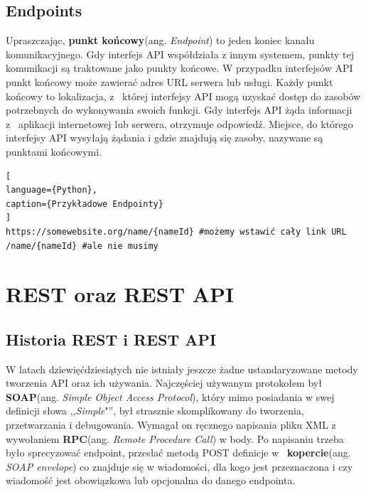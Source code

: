 \documentclass[oneside,polski,logo,indent]{amuthesis}
\begin{document}
\begin{center}
\subsection{Endpoints}
\end{center}
Upraszczając, \textbf{punkt końcowy}(ang. \emph{Endpoint}) to jeden koniec kanału komunikacyjnego. Gdy interfejs API współdziała z innym systemem, punkty tej komunikacji są traktowane jako punkty końcowe. W przypadku interfejsów API punkt końcowy może zawierać adres URL serwera lub usługi. Każdy punkt końcowy to lokalizacja, z~ której interfejsy API mogą uzyskać dostęp do zasobów potrzebnych do wykonywania swoich funkcji. Gdy interfejs API żąda informacji z~ aplikacji internetowej lub serwera, otrzymuje odpowiedź. Miejsce, do którego interfejsy API wysyłają żądania i gdzie znajdują się zasoby, nazywane są punktami końcowymi.

\begin{lstlisting}[
language={Python},
caption={Przykładowe Endpointy}
]
https://somewebsite.org/name/{nameId} #możemy wstawić cały link URL
/name/{nameId} #ale nie musimy
\end{lstlisting}

\section{REST oraz REST API}

\begin{center}
\subsection{Historia REST i REST API}
\end{center}


W latach dziewięćdziesiątych nie istniały jeszcze żadne ustandaryzowane metody tworzenia API oraz ich używania. Najczęściej używanym protokołem był \textbf{SOAP}(ang. \emph{Simple Object Access Protocol}), który mimo posiadania w swej definicji słowa ,,\emph{Simple}"'', był strasznie skomplikowany do tworzenia, przetwarzania i debugowania. Wymagał on ręcznego napisania pliku XML z wywołaniem \textbf{RPC}(ang. \emph{Remote Procedure Call}) w body. Po napisaniu trzeba było sprecyzować endpoint, przesłać metodą POST definicje w~ \textbf{kopercie}(ang. \emph{SOAP envelope}) co znajduje się w wiadomości, dla kogo jest przeznaczona i czy wiadomość jest obowiązkowa lub opcjonalna do danego endpointa.
\end{document}
